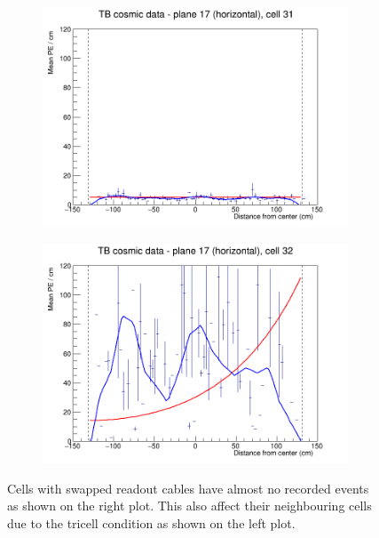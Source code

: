 \documentclass[12pt,a4paper]{article}
\begin{document}
\begin{figure}[h]
  \begin{subfigure}{0.5\textwidth}
    \includegraphics[width=\linewidth]{RelativeCalibrationResults/ep3de_017_031.png}
  \end{subfigure}
  \begin{subfigure}{0.5\textwidth}
    \includegraphics[width=\linewidth]{RelativeCalibrationResults/ep3de_017_032.png}
  \end{subfigure}
  \caption{Cells with swapped readout cables have almost no recorded events as shown on the right plot. This also affect their neighbouring cells due to the tricell condition as shown on the left plot.}
  \label{figAttenfitResultsEpoch3de_LeftoverUnderfilledCell}
\end{figure}
\end{document}
